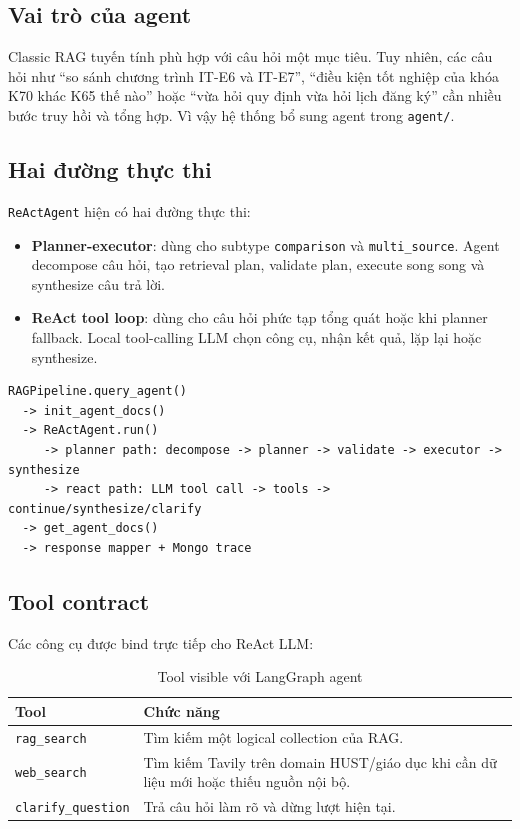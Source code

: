 \documentclass[../DoAn.tex]{subfiles}
\begin{document}
\subsection{Vai trò của agent}

Classic RAG tuyến tính phù hợp với câu hỏi một mục tiêu. Tuy nhiên, các câu hỏi
như ``so sánh chương trình IT-E6 và IT-E7'', ``điều kiện tốt nghiệp của khóa K70
khác K65 thế nào'' hoặc ``vừa hỏi quy định vừa hỏi lịch đăng ký'' cần nhiều bước
truy hồi và tổng hợp. Vì vậy hệ thống bổ sung agent trong \texttt{agent/}.

\subsection{Hai đường thực thi}

\texttt{ReActAgent} hiện có hai đường thực thi:

\begin{itemize}
    \item \textbf{Planner-executor}: dùng cho subtype \texttt{comparison} và
    \texttt{multi\_source}. Agent decompose câu hỏi, tạo retrieval plan, validate
    plan, execute song song và synthesize câu trả lời.
    \item \textbf{ReAct tool loop}: dùng cho câu hỏi phức tạp tổng quát hoặc khi
    planner fallback. Local tool-calling LLM chọn công cụ, nhận kết quả, lặp lại
    hoặc synthesize.
\end{itemize}

\begin{verbatim}
RAGPipeline.query_agent()
  -> init_agent_docs()
  -> ReActAgent.run()
     -> planner path: decompose -> planner -> validate -> executor -> synthesize
     -> react path: LLM tool call -> tools -> continue/synthesize/clarify
  -> get_agent_docs()
  -> response mapper + Mongo trace
\end{verbatim}

\subsection{Tool contract}

Các công cụ được bind trực tiếp cho ReAct LLM:

\begin{table}[h]
\centering
\begin{tabular}{|l|p{8.8cm}|}
\hline
\textbf{Tool} & \textbf{Chức năng} \\
\hline
\texttt{rag\_search} & Tìm kiếm một logical collection của RAG. \\
\hline
\texttt{web\_search} & Tìm kiếm Tavily trên domain HUST/giáo dục khi cần dữ
liệu mới hoặc thiếu nguồn nội bộ. \\
\hline
\texttt{clarify\_question} & Trả câu hỏi làm rõ và dừng lượt hiện tại. \\
\hline
\end{tabular}
\caption{Tool visible với LangGraph agent}
\end{table}
\end{document}
